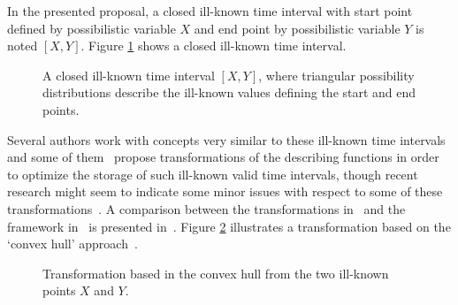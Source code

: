 In the presented proposal, a closed ill-known time interval with start point defined by possibilistic variable $X$ and end point by possibilistic variable $Y$ is noted $\left[X, Y\right]$. Figure \ref{fig:interval} shows a closed ill-known time interval. %


\begin{figure}
\centering

\caption{A closed ill-known time interval $\left[X, Y\right]$, where triangular possibility distributions describe the ill-known values defining the start and end points.}
\label{fig:interval}
\end{figure}


Several authors work with concepts very similar to these ill-known time intervals and some of them~\cite{garrido2009} propose transformations of the describing functions in order to optimize the storage of such ill-known valid time intervals, though recent research might seem to indicate some minor issues with respect to some of these transformations~\cite{Pon11}. A comparison between the transformations in~\cite{garrido2009} and the framework in~\cite{Pon11} is presented in~\cite{pon12}. Figure \ref{fig:convexhull} illustrates a transformation based on the `convex hull' approach~\cite{garrido2009}.



\begin{figure}
\centering

\caption{Transformation based in the convex hull from the two ill-known points $X$ and $Y$. }
\label{fig:convexhull}
\end{figure}

